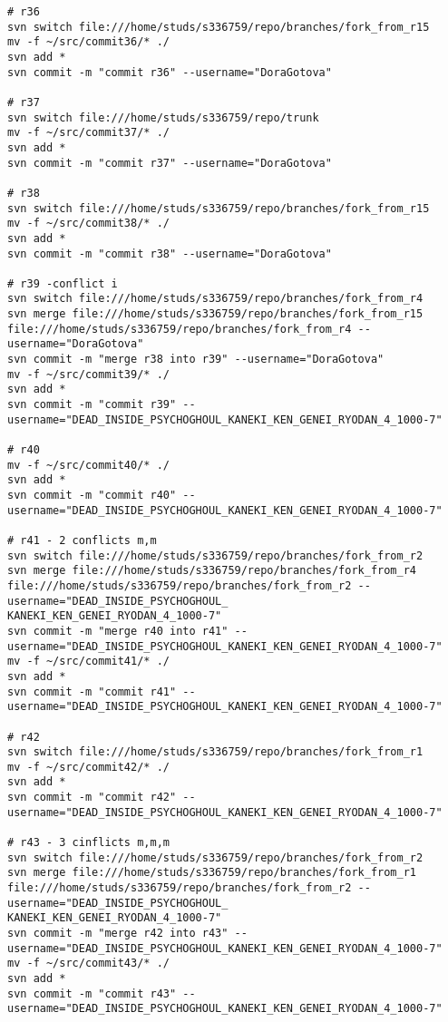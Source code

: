 \thispagestyle{empty}
\BgThispage
\tiny
\begin{verbatim}
# r36
svn switch file:///home/studs/s336759/repo/branches/fork_from_r15
mv -f ~/src/commit36/* ./
svn add *
svn commit -m "commit r36" --username="DoraGotova"

# r37
svn switch file:///home/studs/s336759/repo/trunk
mv -f ~/src/commit37/* ./
svn add *
svn commit -m "commit r37" --username="DoraGotova"

# r38
svn switch file:///home/studs/s336759/repo/branches/fork_from_r15
mv -f ~/src/commit38/* ./
svn add *
svn commit -m "commit r38" --username="DoraGotova"

# r39 -conflict i
svn switch file:///home/studs/s336759/repo/branches/fork_from_r4
svn merge file:///home/studs/s336759/repo/branches/fork_from_r15 file:///home/studs/s336759/repo/branches/fork_from_r4 --username="DoraGotova"
svn commit -m "merge r38 into r39" --username="DoraGotova"
mv -f ~/src/commit39/* ./
svn add *
svn commit -m "commit r39" --username="DEAD_INSIDE_PSYCHOGHOUL_KANEKI_KEN_GENEI_RYODAN_4_1000-7"

# r40
mv -f ~/src/commit40/* ./
svn add *
svn commit -m "commit r40" --username="DEAD_INSIDE_PSYCHOGHOUL_KANEKI_KEN_GENEI_RYODAN_4_1000-7"

# r41 - 2 conflicts m,m
svn switch file:///home/studs/s336759/repo/branches/fork_from_r2
svn merge file:///home/studs/s336759/repo/branches/fork_from_r4 file:///home/studs/s336759/repo/branches/fork_from_r2 --username="DEAD_INSIDE_PSYCHOGHOUL_
KANEKI_KEN_GENEI_RYODAN_4_1000-7"
svn commit -m "merge r40 into r41" --username="DEAD_INSIDE_PSYCHOGHOUL_KANEKI_KEN_GENEI_RYODAN_4_1000-7"
mv -f ~/src/commit41/* ./
svn add *
svn commit -m "commit r41" --username="DEAD_INSIDE_PSYCHOGHOUL_KANEKI_KEN_GENEI_RYODAN_4_1000-7"

# r42
svn switch file:///home/studs/s336759/repo/branches/fork_from_r1
mv -f ~/src/commit42/* ./
svn add *
svn commit -m "commit r42" --username="DEAD_INSIDE_PSYCHOGHOUL_KANEKI_KEN_GENEI_RYODAN_4_1000-7"

# r43 - 3 cinflicts m,m,m
svn switch file:///home/studs/s336759/repo/branches/fork_from_r2
svn merge file:///home/studs/s336759/repo/branches/fork_from_r1 file:///home/studs/s336759/repo/branches/fork_from_r2 --username="DEAD_INSIDE_PSYCHOGHOUL_
KANEKI_KEN_GENEI_RYODAN_4_1000-7"
svn commit -m "merge r42 into r43" --username="DEAD_INSIDE_PSYCHOGHOUL_KANEKI_KEN_GENEI_RYODAN_4_1000-7"
mv -f ~/src/commit43/* ./
svn add *
svn commit -m "commit r43" --username="DEAD_INSIDE_PSYCHOGHOUL_KANEKI_KEN_GENEI_RYODAN_4_1000-7"


\end{verbatim}
